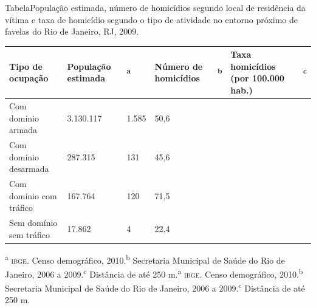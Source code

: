 \documentclass{article}
\begin{document}
TabelaPopulação estimada, número de homicídios segundo local de residência da
vítima e taxa de homicídio segundo o tipo de atividade no entorno próximo de
favelas do Rio de Janeiro, RJ, 2009.
\begin{table}
\begin{adjustbox}{width=1\textwidth}
\small
\begin{xtabular}{ l | l | l | l | l | l | l }
\hline
Tipo de ocupação & População estimada &\textsuperscript{a}
& Número de homicídios &\textsuperscript{b}
& Taxa homicídios (por 100.000 hab.) &\textsuperscript{c}
\\ \hline
Com domínio armada & 3.130.117 & 1.585 & 50,6\\ \hline

Com domínio desarmada & 287.315 & 131 & 45,6\\ \hline

Com domínio com tráfico & 167.764 & 120 & 71,5\\ \hline

Sem domínio sem tráfico & 17.862 & 4 & 22,4\\ \hline

\end{xtabular}
\end{adjustbox}
\end{table}\textsuperscript{a}
\textsc{ibge}. Censo demográfico, 2010.\textsuperscript{b}
Secretaria Municipal de Saúde do Rio de Janeiro, 2006 a 2009.\textsuperscript{c}
Distância de até 250 m.\textsuperscript{a}
\textsc{ibge}. Censo demográfico, 2010.\textsuperscript{b}
Secretaria Municipal de Saúde do Rio de Janeiro, 2006 a 2009.\textsuperscript{c}
Distância de até 250 m.
\end{document}
